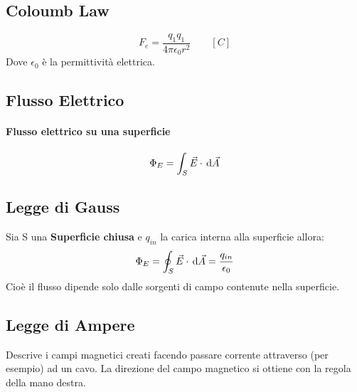 \subsection{Coloumb Law}
\begin{equation}
	F_e = \frac{q_1 q_1}{4\pi \epsilon_0 r^2} \qquad[C] \tag{Forza di Coloumb}
\end{equation}
Dove $\epsilon_0$ è la permittività elettrica.

\subsection{Flusso Elettrico}
\paragraph{Flusso elettrico su una superficie}
\begin{equation}
	\Phi_E = \int_{S} \vec{E} \cdot \,\mathrm{d} \vec{A}
\end{equation}

\subsection{Legge di Gauss}
Sia S una \textbf{Superficie chiusa} e $q_{in}$ la carica interna alla superficie allora:
\begin{equation}
	\Phi_E = \oint_{S} \vec{E} \cdot \,\mathrm{d} \vec{A} = \frac{q_{in}}{\epsilon_0}
\end{equation}
Cioè il flusso dipende solo dalle sorgenti di campo contenute nella superficie.
\subsection{Legge di Ampere}
Descrive i campi magnetici creati facendo passare corrente attraverso (per esempio) ad un cavo. La direzione del campo magnetico si ottiene con la regola della mano destra.

